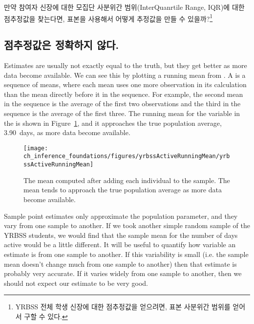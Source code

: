 \begin{exercise}
만약 참여자 신장에 대한 모집단 사분위간 범위(InterQuanrtile Range, IQR)에 대한 점추정값을 찾는다면, 표본을 사용해서 어떻게 추정값을 만들 수 있을까?\footnote{YRBSS 전체 학생 신장에 대한 점추정값을 얻으려면, 표본 사분위간 범위를 얻어서 구할 수 있다.}


\end{exercise}

\subsection{점추정값은 정확하지 않다.}

Estimates are usually not exactly equal to the truth, but they get better as more data become available. We can see this by plotting a running mean from . A  is a sequence of means, where each mean uses one more observation in its calculation than the mean directly before it in the sequence. For example, the second mean in the sequence is the average of the first two observations and the third in the sequence is the average of the first three. The running mean for the  variable in the  is shown in Figure~\ref{yrbssActiveRunningMean}, and it approaches the true population average, 3.90~days, as more data become available.

\begin{figure}[h]
   \centering
   \texttt{[image: ch\_inference\_foundations/figures/yrbssActiveRunningMean/yrbssActiveRunningMean]}
   \caption{The mean computed after adding each individual to the sample. The mean tends to approach the true population average as more data become available.}
   \label{yrbssActiveRunningMean}
\end{figure}

Sample point estimates only approximate the population parameter, and they vary from one sample to another. If we took another simple random sample of the YRBSS students, we would find that the sample mean for the number of days active would be a little different. It will be useful to quantify how variable an estimate is from one sample to another. If this variability is small (i.e. the sample mean doesn't change much from one sample to another) then that estimate is probably very accurate. If it varies widely from one sample to another, then we should not expect our estimate to be very good.


